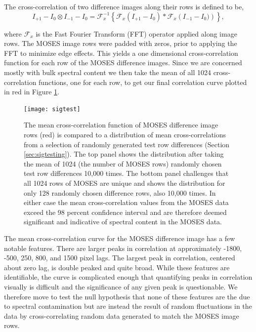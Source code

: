  		The cross-correlation of two difference images along their rows is defined to be,
	 	\begin{equation}
		 	I_{+1}-I_0 \otimes I_{-1}-I_0 = \mathcal{F}_x^{-1} \left\{\mathcal{F}_x\left(I_{+1}-I_0 \right)*\mathcal{F}_x\left( I_{-1}-I_0) \right)  \right\},
		 	\label{eqn:cross_correlate}
	 	\end{equation}
        
	 	where $\mathcal{F}_x$ is the Fast Fourier Transform (FFT) operator applied along image rows.
	 	The MOSES image rows were padded with zeros, prior to applying the FFT to minimize edge effects.   	
		This yields a one dimensional cross-correlation function for each row of the MOSES difference images.  
		Since we are concerned mostly with bulk spectral content we then take the mean of all 1024 cross-correlation functions, one for each row, to get our final correlation curve plotted in red in Figure \ref{fig:sigtest}. 
		 
		 \begin{figure}
		 	\centering
		 	\texttt{[image: sigtest]}
		 	\caption{The mean cross-correlation function of MOSES difference image rows (red) is compared to a distribution of mean cross-correlations from a selection of randomly generated test row differences (Section \ref{sec:sigtesting}). 
		 	The top panel shows the distribution after taking the mean of 1024 (the number of MOSES rows) randomly chosen test row differences 10,000 times.  
		 	The bottom panel challenges that all 1024 rows of MOSES are unique and shows the distribution for only 128 randomly chosen difference rows, also 10,000 times.  
		 	In either case the mean cross-correlation values from the MOSES data exceed the 98 percent confidence interval and are therefore deemed significant and indicative of spectral content in the MOSES data.}
		 	\label{fig:sigtest}
		 \end{figure}
		 
	 
		 The mean cross-correlation curve for the MOSES difference image has a few notable features.  
		 There are larger peaks in correlation  at approximately -1800, -500, 250, 800, and 1500 pixel lags.  
		 The largest peak in correlation, centered about zero lag, is double peaked and quite broad.   
		 While these features are identifiable, the curve is complicated enough that quantifying peaks in correlation visually is difficult and the significance of any given peak is questionable. 
		 We therefore move to test the null hypothesis that none of these features are the due to spectral contamination but are instead the result of random fluctuations in the data by cross-correlating random data generated to match the MOSES image rows.
 
